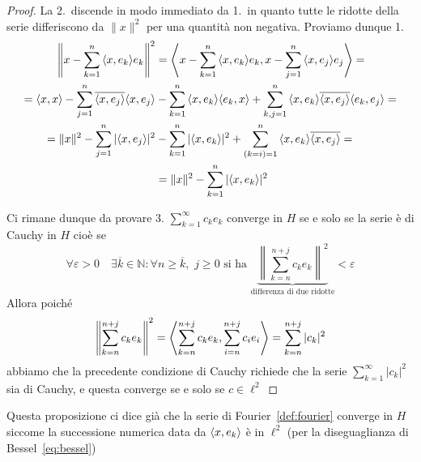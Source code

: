 \begin{proof}
    La 2.~discende in modo immediato da 1.~in quanto tutte le ridotte della
    serie differiscono da \(\|x\|^2\) per una quantità non negativa.
    Proviamo dunque 1.
    \begin{align*}
        \left\|x - \sum_{k=1}^{n} {\left\langle x, e_{k}\right\rangle} e_{k} \right\|^2 &= {\left\langle x -
          \sum_{k=1}^{n} {\left\langle x, e_{k}\right\rangle} e_{k}, x - \sum_{j=1}^{n} {\left\langle x,
    e_{j}\right\rangle} e_{j}\right\rangle} = \\ = {\left\langle x, x\right\rangle} - \sum_{j=1}^{n} \overline{{\left\langle x, e_{j}\right\rangle}
        }{\left\langle x, e_{j}\right\rangle} &- \sum_{k=1}^{n} {\left\langle x, e_{k}\right\rangle} {\left\langle e_{k}, x\right\rangle} +
\sum_{k,j=1}^{n} {\left\langle x, e_{k}\right\rangle} \overline{{\left\langle x, e_{j}\right\rangle}}{\left\langle e_{k}, e_{j}\right\rangle} =
\\
= \|x\|^2 - \sum_{j=1}^{n} |{\left\langle x, e_{j}\right\rangle} |^2 &- \sum_{k=1}^{n} |{\left\langle x,
e_{k}\right\rangle}|^2 + \sum_{(k=i)=1}^{n} {\left\langle x, e_{k}\right\rangle} \overline{{\left\langle x, e_{j}\right\rangle}} = \\ &=
\|x\|^2 - \sum_{k=1}^{n} |{\left\langle x, e_{k}\right\rangle} |^2
    \end{align*}

    Ci rimane dunque da provare 3. 
    \(\sum_{k=1}^{\infty} c_{k} e_{k} \) converge in \(H\) se e solo se la serie
    è di Cauchy in \(H\) cioè se
    \[
      \forall \varepsilon > 0 \quad \exists \overline{k} \in \mathbb{N} :
      \forall n \ge \overline{k},\,\,j \ge 0 \text{ si ha } \underbrace{\left\|
      \sum_{k=n}^{n+j} c_{k} e_{k} \right\|^2}_{\text{differenza di due ridotte}}  < \varepsilon
    \]
    Allora poiché
    \[
      \left\|\sum_{k=n}^{n+j} c_{k} e_{k} \right\|^2 = {\left\langle\sum_{k=n}^{n+j}
      c_{k} e_{k}, \sum_{i=n}^{n+j} c_{i} e_{i }\right\rangle} = \sum_{k=n}^{n+j} |c_{k}|^2
    \]
    abbiamo che la precedente condizione di Cauchy richiede che la serie
    \(\sum_{k=1}^{\infty} |c_k|^2 \) sia di Cauchy, e questa converge se e solo
    se \(c \in \ell^2\) 
\end{proof}
\begin{remark}
    Questa proposizione ci dice già che la serie di Fourier~\ref{def:fourier}
    converge in \(H\) siccome la successione numerica data da \({\left\langle x,
    e_{k}\right\rangle}\) è in \(\ell^2\) (per la diseguaglianza di Bessel~\eqref{eq:bessel})
\end{remark}

